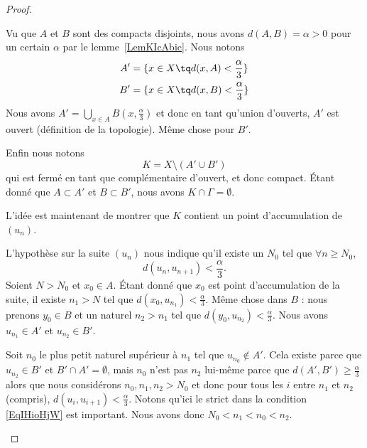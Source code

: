 \begin{proof}
\begin{subproof}
		Vu que \( A\) et \( B\) sont des compacts disjoints, nous avons \( d(A,B)=\alpha>0\) pour un certain \( \alpha\) par le lemme~\ref{LemKIcAbic}. Nous notons
		\begin{subequations}
			\begin{align}
				A' & =\{x\in X\tq d(x,A)<\frac{ \alpha }{ 3 }\} \\
				B' & =\{x\in X\tq d(x,B)<\frac{ \alpha }{ 3 }\}
			\end{align}
		\end{subequations}
		Nous avons \( A'=\bigcup_{x\in A}B(x,\frac{ \alpha }{ 3 })\) et donc en tant qu'union d'ouverts, \( A'\) est ouvert (définition de la topologie). Même chose pour \( B'\).

		Enfin nous notons
		\begin{equation}
			K=X\setminus(A'\cup B')
		\end{equation}
		qui est fermé en tant que complémentaire d'ouvert, et donc compact. Étant donné que \( A\subset A'\) et \( B\subset B' \), nous avons \( K\cap \Gamma=\emptyset\).

		L'idée est maintenant de montrer que \( K\) contient un point d'accumulation de \( (u_n)\).


		L'hypothèse sur la suite \( (u_n)\) nous indique qu'il existe un \( N_0\) tel que \( \forall n\geq N_0\),
		\begin{equation}    \label{EqIHioHjW}
			d(u_{n},u_{n+1})<\frac{ \alpha }{ 3 }.
		\end{equation}
		Soient \( N>N_0 \) et \( x_0\in A\). Étant donné que \( x_0\) est point d'accumulation de la suite, il existe \( n_1>N\) tel que \( d(x_0,u_{n_1})<\frac{ \alpha }{ 3 }\). Même chose dans \( B\) : nous prenons \( y_0\in B\) et un naturel \( n_2>n_1\) tel que \( d(y_0,u_{n_2})<\frac{ \alpha }{ 3 }\). Nous avons \( u_{n_1}\in A'\) et \( u_{n_2}\in B'\).

		Soit \( n_0\) le plus petit naturel supérieur à \( n_1\) tel que \( u_{n_0}\notin A'\). Cela existe parce que \( u_{n_2}\in B'\) et \( B'\cap A'=\emptyset\), mais \( n_0\) n'est pas \( n_2\) lui-même parce que \( d(A',B')\geq \frac{ \alpha }{ 3 }\) alors que nous considérons \( n_0,n_1,n_2>N_0\) et donc pour tous les \( i\) entre \( n_1\) et \( n_2\) (compris), \( d(u_i,u_{i+1})<\frac{ \alpha }{ 3 }\). Notons qu'ici le strict dans la condition \eqref{EqIHioHjW} est important. Nous avons donc \(N_0<n_1<n_0<n_2\).


\end{subproof}
\end{proof}
